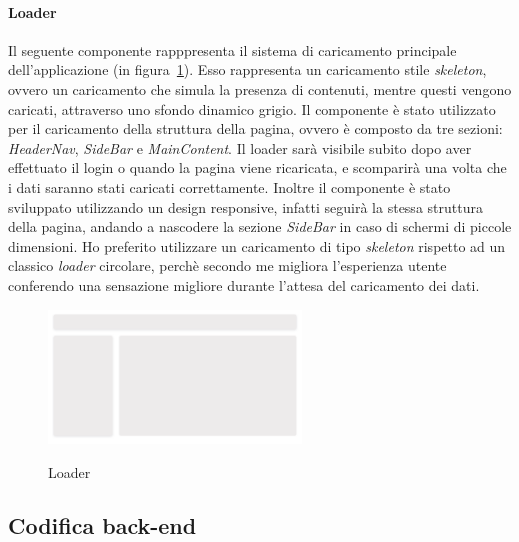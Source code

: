 \paragraph{Loader}\label{par:loader}
Il seguente componente rapppresenta il sistema di caricamento principale dell'applicazione (in figura~\ref{fig:loader}).
Esso rappresenta un caricamento stile \textit{skeleton}, ovvero un caricamento che simula la presenza di contenuti, mentre questi vengono caricati, attraverso 
uno sfondo dinamico grigio.
Il componente è stato utilizzato per il caricamento della struttura della pagina, ovvero è composto da tre sezioni: \textit{HeaderNav}, \textit{SideBar} e
\textit{MainContent}. Il loader sarà visibile subito dopo aver effettuato il login o quando la pagina viene ricaricata, e scomparirà una volta che i dati saranno stati caricati correttamente.
Inoltre il componente è stato sviluppato utilizzando un design responsive, infatti seguirà la stessa struttura della pagina, andando a nascodere la sezione 
\textit{SideBar} in caso di schermi di piccole dimensioni.
Ho preferito utilizzare un caricamento di tipo \textit{skeleton} rispetto ad un classico \textit{loader} circolare, perchè secondo me migliora l'esperienza utente 
conferendo una sensazione migliore durante l'attesa del caricamento dei dati.

\begin{figure}[ht]
  \centering
  \includegraphics[width=0.6\textwidth, alt={Skeleton loader di caricamento principale dell'applicazione}]{images/frontend/Loader.jpg}
  \caption{Loader}\label{fig:loader}
\end{figure}


\subsection{Codifica back-end}\label{subsec:codifica-back-end}



